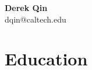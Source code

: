 \documentclass[letterpaper,11pt]{article}
\begin{document}
\begin{center}
	\textbf{\huge Derek Qin}\\
	dqin@caltech.edu\\
\end{center}

\section{Education}
\end{document}

